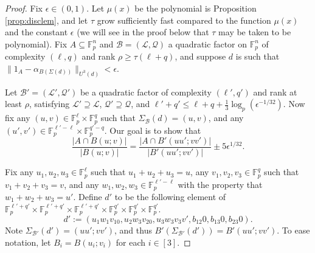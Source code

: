 \documentclass[12pt,oneside,british,a4wide]{amsart}
\numberwithin{equation}{section}
\theoremstyle{definition}
\def\F{\mathbb{F}}
\def\e{\epsilon}
\newcommand{\calL}{\mathcal{L}}
\newcommand{\calB}{\mathcal{B}}
\newcommand{\calQ}{\mathcal{Q}}
\begin{document}
\begin{proof}
Fix $\e\in (0,1)$. Let $\mu(x)$ be the polynomial is Proposition \ref{prop:disclem}, and let $\tau$ grow sufficiently fast compared to the function $\mu(x)$ and the constant $\e$ (we will see in the proof below that $\tau$ may be taken to be polynomial).  Fix $A\subseteq \F_p^n$ and $\calB=(\calL,\calQ)$ a quadratic factor  on $\F_p^n$ of complexity $(\ell, q)$ and rank $\rho\geq \tau(\ell+q)$, and suppose $d$ is such that $\|1_A-\alpha_{B(\Sigma(d))}\|_{U^3(d)}<\e$.  

Let $\calB'=(\calL',\calQ')$ be a quadratic factor of complexity $(\ell',q')$ and rank at least $\rho$, satisfying $\calL'\supseteq \calL$, $\calQ'\supseteq \calQ$, and $\ell'+q'\leq \ell+q+\frac{1}{3}\log_p(\e^{-1/32})$.  Now fix any $(u,v)\in \F_p^{\ell}\times \F_p^{q}$ such that $\Sigma_{\calB}(d)=(u,v)$, and any $(u',v')\in \F_p^{\ell'-\ell}\times \F_p^{q'-q}$. Our goal is to show that 
\[\frac{|A\cap B(u;v)|}{|B(u;v)|}=\frac{|A\cap  B'(uu';vv')|}{|B'(uu';vv')|}\pm 5\e^{1/32}.\]

Fix any $u_1,u_2,u_3\in \F_p^{\ell}$ such that $u_1+u_2+u_3=u$, any $v_1,v_2,v_3\in \F_p^q$ such that $v_1+v_2+v_3=v$, and any $w_1,w_2,w_3\in \F_p^{\ell'-\ell}$ with the property that $w_1+w_2+w_3=u'$. Define $d'$ to be the following element of $\F_p^{\ell'+q'}\times \F_p^{\ell'+q'}\times \F_p^{\ell'+q'}\times \F_p^{ q'}\times \F_p^{ q'}\times \F_p^{q'}$.
$$
d':=(u_1w_1v_10, u_2w_3v_20, u_3w_3 v_3v', b_{12}0, b_{13}0, b_{23}0).
$$
Note $\Sigma_{\calB'}(d')=(uu'; vv')$, and thus $B'(\Sigma_{\calB'}(d'))=B'(uu';vv')$.  To ease notation, let $B_i=B(u_i;v_i)$ for each $i\in [3]$.


\end{proof}
\end{document}
